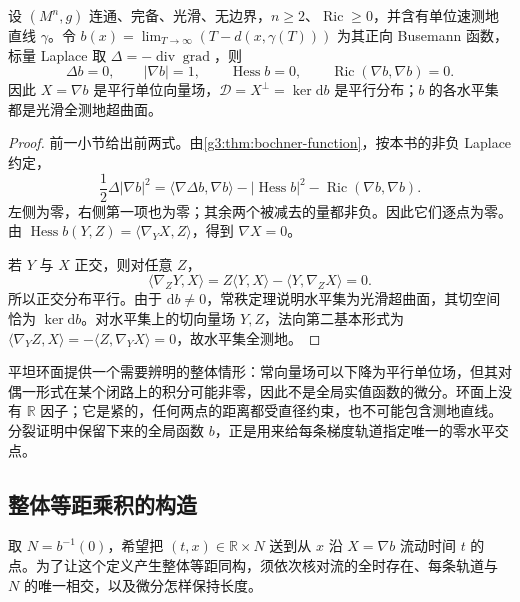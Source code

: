 \begin{proposition}\label{g3:prop:line-busemann-parallel-gradient}
	设 \((M^n,g)\) 连通、完备、光滑、无边界，\(n\ge2\)、\(\operatorname{Ric}\ge0\)，并含有单位速测地直线 \(\gamma\)。令 \(b(x)=\lim_{T\to\infty}(T-d(x,\gamma(T)))\) 为其正向 Busemann 函数，标量 Laplace 取 \(\Delta=-\operatorname{div}\operatorname{grad}\)，则
	\[
		\Delta b=0,\qquad |\nabla b|=1,\qquad
		\operatorname{Hess}b=0,
		\qquad \operatorname{Ric}(\nabla b,\nabla b)=0.
	\]
	因此 \(X=\nabla b\) 是平行单位向量场，\(\mathcal D=X^\perp=\ker\mathrm db\) 是平行分布；\(b\) 的各水平集都是光滑全测地超曲面。
\end{proposition}
\begin{proof}
	前一小节给出前两式。由\cref{g3:thm:bochner-function}，按本书的非负 Laplace 约定，
	\[
		\frac12\Delta|\nabla b|^2
		=\langle\nabla\Delta b,\nabla b\rangle
		-|\operatorname{Hess}b|^2
		-\operatorname{Ric}(\nabla b,\nabla b).
	\]
	左侧为零，右侧第一项也为零；其余两个被减去的量都非负。因此它们逐点为零。由
	\(\operatorname{Hess}b(Y,Z)=\langle\nabla_YX,Z\rangle\)，得到 \(\nabla X=0\)。

	若 \(Y\) 与 \(X\) 正交，则对任意 \(Z\)，
	\[
		\langle\nabla_ZY,X\rangle
		=Z\langle Y,X\rangle-\langle Y,\nabla_ZX\rangle=0.
	\]
	所以正交分布平行。由于 \(\mathrm db\ne0\)，常秩定理说明水平集为光滑超曲面，其切空间恰为 \(\ker\mathrm db\)。对水平集上的切向量场 \(Y,Z\)，法向第二基本形式为
	\(\langle\nabla_YZ,X\rangle=-\langle Z,\nabla_YX\rangle=0\)，故水平集全测地。
\end{proof}

平坦环面提供一个需要辨明的整体情形：常向量场可以下降为平行单位场，但其对偶一形式在某个闭路上的积分可能非零，因此不是全局实值函数的微分。环面上没有 \(\mathbb R\) 因子；它是紧的，任何两点的距离都受直径约束，也不可能包含测地直线。分裂证明中保留下来的全局函数 \(b\)，正是用来给每条梯度轨道指定唯一的零水平交点。

\subsection{整体等距乘积的构造}
\label{g3:subsec:1505:05}
取 \(N=b^{-1}(0)\)，希望把 \((t,x)\in\mathbb R\times N\) 送到从 \(x\) 沿 \(X=\nabla b\) 流动时间 \(t\) 的点。为了让这个定义产生整体等距同构，须依次核对流的全时存在、每条轨道与 \(N\) 的唯一相交，以及微分怎样保持长度。

